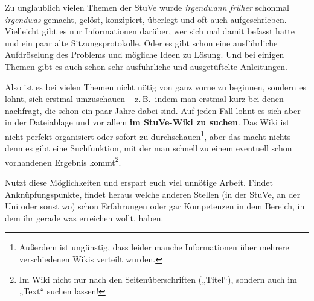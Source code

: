 


%
%
%


\null
\clearpage


\null
\vfill
Zu unglaublich vielen Themen der StuVe wurde \textit{irgendwann früher}{\textsuperscript\texttrademark} schonmal \textit{irgendwas}{\textsuperscript\textcopyright} gemacht, gelöst, konzipiert, überlegt und oft auch aufgeschrieben. Vielleicht gibt es nur Informationen darüber, wer sich mal damit befasst hatte und ein paar alte Sitzungsprotokolle. Oder es gibt schon eine ausführliche Aufdröselung des Problems und mögliche Ideen zu Lösung. Und bei einigen Themen gibt es auch schon sehr ausführliche und ausgetüftelte Anleitungen.

Also ist es bei vielen Themen nicht nötig von ganz vorne zu beginnen, sondern es lohnt, sich erstmal umzuschauen -- z.\,B.~indem man erstmal kurz bei denen nachfragt, die schon ein paar Jahre dabei sind. Auf jeden Fall lohnt es sich aber in der Dateiablage und vor allem \textbf{im StuVe-Wiki zu suchen}. Das Wiki ist nicht perfekt organisiert oder sofort zu durchschauen\footnote{Außerdem ist ungünstig, dass leider manche Informationen über mehrere verschiedenen Wikis verteilt wurden.}, aber das macht nichts denn es gibt eine Suchfunktion, mit der man schnell zu einem eventuell schon vorhandenen Ergebnis kommt\footnote{Im Wiki nicht nur nach den Seitenüberschriften („Titel“), sondern auch im „Text“ suchen lassen!}.

Nutzt diese Möglichkeiten und erspart euch viel unnötige Arbeit. Findet Anknüpfungspunkte, findet heraus welche anderen Stellen (in der StuVe, an der Uni oder sonst wo) schon Erfahrungen oder gar Kompetenzen in dem Bereich, in dem ihr gerade was erreichen wollt, haben.
\vfill
\vfill
